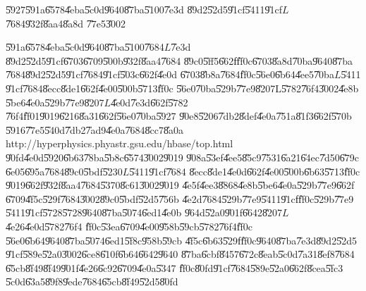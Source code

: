 \begin{case}
\U{5927}\U{591a}\U{6578}\U{4eba}\U{5c0d}\U{9640}\U{87ba}\U{5100}\U{7e3d}%
\U{89d2}\U{52d5}\U{91cf}\U{5411}\U{91cf}$L$\U{7684}\U{932f}\U{8aa4}\U{8a8d}%
\U{77e5}\U{3002}
\end{case}

\U{591a}\U{6578}\U{4eba}\U{5c0d}\U{9640}\U{87ba}\U{5100}\U{7684}$L$\U{7e3d}%
\U{89d2}\U{52d5}\U{91cf}\U{6703}\U{6709}\U{500b}\U{932f}\U{8aa4}\U{7684}%
\U{89c0}\U{5ff5}\U{662f}\U{ff0c}\U{6703}\U{8a8d}\U{70ba}\U{9640}\U{87ba}%
\U{7684}\U{89d2}\U{52d5}\U{91cf}\U{7684}\U{91cf}\U{503c}\U{662f}\U{4e0d}%
\U{6703}\U{8b8a}\U{7684}\U{ff0c}\U{56e0}\U{6b64}\U{4ee5}\U{70ba}$L$\U{5411}%
\U{91cf}\U{7684}\U{8ecc}\U{8de1}\U{662f}\U{4e00}\U{500b}\U{5713}\U{ff0c}%
\U{56e0}\U{70ba}\U{529b}\U{77e9}\U{8207}L\U{5782}\U{76f4}\U{3002}\U{4e8b}%
\U{5be6}\U{4e0a}\U{529b}\U{77e9}\U{8207}$L$\U{4e0d}\U{7e3d}\U{662f}\U{5782}%
\U{76f4}\U{ff01}\U{9019}\U{6216}\U{8a31}\U{662f}\U{56e0}\U{70ba}\U{5927}%
\U{90e8}\U{5206}\U{7db2}\U{8def}\U{4e0a}\U{751a}\U{81f3}\U{662f}\U{570b}%
\U{5916}\U{77e5}\U{540d}\U{7db2}\U{7ad9}\U{4e0a}\U{7684}\U{8cc7}\U{8a0a}%
\newline
http://hyperphysics.phyastr.gsu.edu/hbase/top.html\newline
\U{90fd}\U{4e0d}\U{5920}\U{6b63}\U{78ba}\U{5b8c}\U{6574}\U{3002}\U{9019}%
\U{908a}\U{53ef}\U{4ee5}\U{85c9}\U{7531}\U{6a21}\U{64ec}\U{7d50}\U{679c}%
\U{6e05}\U{695a}\U{7684}\U{89c0}\U{5bdf}\U{5230}$L$\U{5411}\U{91cf}\U{7684}%
\U{8ecc}\U{8de1}\U{4e0d}\U{662f}\U{4e00}\U{500b}\U{6b63}\U{5713}\U{ff0c}%
\U{9019}\U{662f}\U{932f}\U{8aa4}\U{7684}\U{5370}\U{8c61}\U{3002}\U{9019}%
\U{4e5f}\U{4ee3}\U{8868}\U{4e8b}\U{5be6}\U{4e0a}\U{529b}\U{77e9}\U{662f}%
\U{6709}\U{4f5c}\U{529f}\U{7684}\U{3002}\U{89c0}\U{5bdf}\U{52d5}\U{756b}%
\U{4e2d}\U{7684}\U{529b}\U{77e9}\U{5411}\U{91cf}\U{ff0c}\U{529b}\U{77e9}%
\U{5411}\U{91cf}\U{5728}\U{5728}\U{9640}\U{87ba}\U{5074}\U{6ed1}\U{4e0b}%
\U{964d}\U{52a0}\U{901f}\U{6642}\U{8207}$L$\U{4e26}\U{4e0d}\U{5782}\U{76f4}%
\U{ff0c}\U{53ea}\U{6709}\U{4e00}\U{958b}\U{59cb}\U{5782}\U{76f4}\U{ff0c}%
\U{56e0}\U{6b64}\U{9640}\U{87ba}\U{5074}\U{6ed1}\U{5f8c}\U{958b}\U{59cb}%
\U{4f5c}\U{6b63}\U{529f}\U{ff0c}\U{9640}\U{87ba}\U{7e3d}\U{89d2}\U{52d5}%
\U{91cf}\U{589e}\U{52a0}\U{3002}\U{6ce8}\U{610f}\U{6b64}\U{6642}\U{9640}%
\U{87ba}\U{6cbf}\U{8457}\U{672c}\U{8eab}\U{5c0d}\U{7a31}\U{8ef8}\U{7684}%
\U{65cb}\U{8f49}\U{8f49}\U{901f}\U{4e26}\U{6c92}\U{6709}\U{4e0a}\U{5347}%
\U{ff0c}\U{80fd}\U{91cf}\U{7684}\U{589e}\U{52a0}\U{662f}\U{8cea}\U{5fc3}%
\U{5c0d}\U{63a5}\U{89f8}\U{9ede}\U{7684}\U{65cb}\U{8f49}\U{52d5}\U{80fd}%
